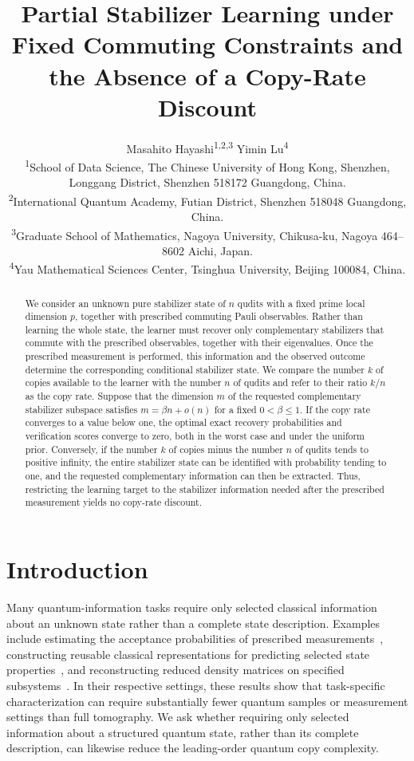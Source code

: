 \documentclass[11pt]{article}
\title{Partial Stabilizer Learning under Fixed Commuting Constraints and the Absence of a Copy-Rate Discount}
\author{%
\parbox{0.95\textwidth}{\centering
Masahito Hayashi\textsuperscript{1,2,3}
\quad
Yimin Lu\textsuperscript{4}\\[0.75em]
\small
\textsuperscript{1}School of Data Science, The Chinese University of Hong Kong,
Shenzhen, Longgang District, Shenzhen 518172 Guangdong, China.\\
\textsuperscript{2}International Quantum Academy, Futian District,
Shenzhen 518048 Guangdong, China.\\
\textsuperscript{3}Graduate School of Mathematics, Nagoya University,
Chikusa-ku, Nagoya 464--8602 Aichi, Japan.\\
\textsuperscript{4}Yau Mathematical Sciences Center, Tsinghua University,
Beijing 100084, China.}}
\date{}
\newcommand{\1}{\mathbf 1}
\theoremstyle{plain}
\theoremstyle{definition}
\theoremstyle{remark}
\begin{document}
\maketitle

\begin{abstract}
We consider an unknown pure stabilizer state of \(n\) qudits with a fixed prime local dimension \(p\), together with prescribed commuting Pauli observables. Rather than learning the whole state, the learner must recover only complementary stabilizers that commute with the prescribed observables, together with their eigenvalues. Once the prescribed measurement is performed, this information and the observed outcome determine the corresponding conditional stabilizer state. We compare the number \(k\) of copies available to the learner with the number \(n\) of qudits and refer to their ratio \(k/n\) as the copy rate.
Suppose that the dimension \(m\) of the requested complementary stabilizer subspace satisfies \(m=\beta n+o(n)\) for a fixed \(0<\beta\leq1\). If the copy rate converges to a value below one, the optimal exact recovery probabilities and verification scores converge to zero, both in the worst case and under the uniform prior. Conversely, if the number \(k\) of copies minus the number \(n\) of qudits tends to positive infinity, the entire stabilizer state can be identified with probability tending to one, and the requested complementary information can then be extracted. Thus, restricting the learning target to the stabilizer information needed after the prescribed measurement yields no copy-rate discount.
\end{abstract}
\section{Introduction}
\label{sec:introduction}
Many quantum-information tasks require only selected classical information about an unknown state rather than a complete state description. 
Examples include estimating the acceptance probabilities of prescribed measurements~\cite{Aaronson2018ShadowTomography, BadescuODonnell2024ImprovedQuantumData, KingEtAl2025TriplyEfficient, Sinha2025DimensionIndependent}, 
constructing reusable classical representations for predicting selected state properties~\cite{HuangKuengPreskill2020ClassicalShadows, ChenYuZengFlammia2021RobustShadows, HadfieldEtAl2022LocallyBiasedShadows, BertoniEtAl2024ShallowShadows}, 
and reconstructing reduced density matrices on specified subsystems~\cite{CotlerWilczek2020OverlappingTomography, BonetMonroigBabbushOBrien2020PartialTomography, AraujoEtAl2022LocalOverlappingTomography, HansenneEtAl2025OptimalOverlapping}. 
In their respective settings, these results show that task-specific characterization can require substantially fewer quantum samples or measurement settings than full tomography. 
We ask whether requiring only selected information about a structured quantum state, rather than its complete description, can likewise reduce the leading-order quantum copy complexity.
\end{document}
